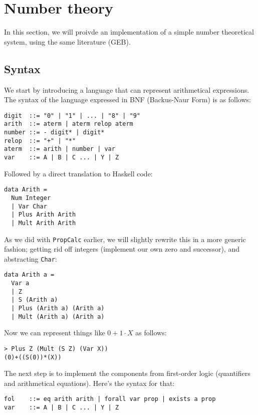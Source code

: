 \documentclass{article}
\begin{document}
\section{Number theory}

In this section, we will proivde an implementation of a simple number theoretical system, using the same literature (GEB).

\subsection{Syntax}

We start by introducing a language that can represent arithmetical expressions. The syntax of the language expressed in BNF (Backus-Naur Form) is as follows:

\begin{lstlisting}
digit  ::= "0" | "1" | ... | "8" | "9"
arith  ::= aterm | aterm relop aterm
number ::= - digit* | digit*
relop  ::= "+" | "*"
aterm  ::= arith | number | var
var    ::= A | B | C ... | Y | Z
\end{lstlisting}

Followed by a direct translation to Haskell code:

\begin{lstlisting}
data Arith =
  Num Integer
  | Var Char
  | Plus Arith Arith
  | Mult Arith Arith
\end{lstlisting}

As we did with \texttt{PropCalc} earlier, we will slightly rewrite this in a more generic fashion; getting rid off integers (implement our own zero and successor), and abstracting \texttt{Char}:

\begin{lstlisting}
data Arith a =
  Var a
  | Z
  | S (Arith a)
  | Plus (Arith a) (Arith a)
  | Mult (Arith a) (Arith a)
\end{lstlisting}

Now we can represent things like $0 + 1 \cdot X$ as follows:

\begin{lstlisting}
> Plus Z (Mult (S Z) (Var X))
(0)+((S(0))*(X))
\end{lstlisting}

The next step is to implement the components from first-order logic (quantifiers and arithmetical equations). Here's the syntax for that:

\begin{lstlisting}
fol    ::= eq arith arith | forall var prop | exists a prop
var    ::= A | B | C ... | Y | Z
\end{lstlisting}
\end{document}
